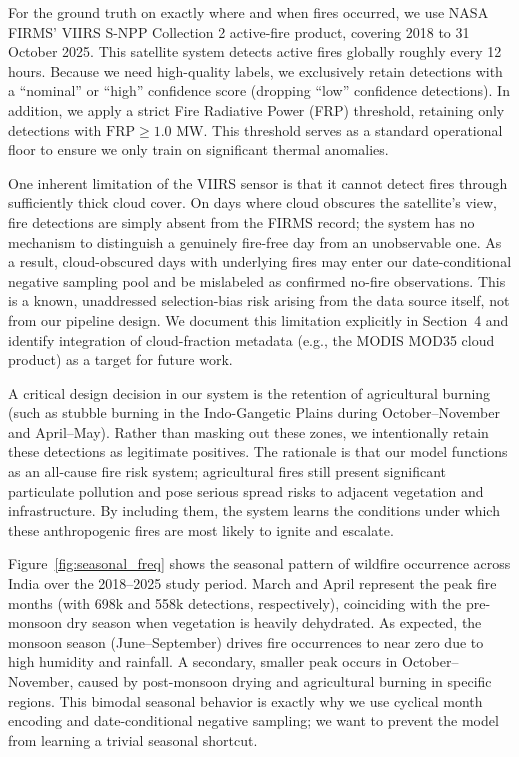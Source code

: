 \documentclass[11pt]{article}
\begin{document}
For the ground truth on exactly where and when fires occurred, we use NASA FIRMS' VIIRS S-NPP Collection 2 active-fire product, covering 2018 to 31 October 2025. This satellite system detects active fires globally roughly every 12 hours. Because we need high-quality labels, we exclusively retain detections with a ``nominal'' or ``high'' confidence score (dropping ``low'' confidence detections). In addition, we apply a strict Fire Radiative Power (FRP) threshold, retaining only detections with $\text{FRP} \ge 1.0$ MW. This threshold serves as a standard operational floor to ensure we only train on significant thermal anomalies.

One inherent limitation of the VIIRS sensor is that it cannot detect fires through sufficiently thick cloud cover. On days where cloud obscures the satellite's view, fire detections are simply absent from the FIRMS record; the system has no mechanism to distinguish a genuinely fire-free day from an unobservable one. As a result, cloud-obscured days with underlying fires may enter our date-conditional negative sampling pool and be mislabeled as confirmed no-fire observations. This is a known, unaddressed selection-bias risk arising from the data source itself, not from our pipeline design. We document this limitation explicitly in Section~4 and identify integration of cloud-fraction metadata (e.g., the MODIS MOD35 cloud product) as a target for future work.

A critical design decision in our system is the retention of agricultural burning (such as stubble burning in the Indo-Gangetic Plains during October--November and April--May). Rather than masking out these zones, we intentionally retain these detections as legitimate positives. The rationale is that our model functions as an all-cause fire risk system; agricultural fires still present significant particulate pollution and pose serious spread risks to adjacent vegetation and infrastructure. By including them, the system learns the conditions under which these anthropogenic fires are most likely to ignite and escalate.

Figure~\ref{fig:seasonal_freq} shows the seasonal pattern of wildfire occurrence across India over the 2018--2025 study period. March and April represent the peak fire months (with 698k and 558k detections, respectively), coinciding with the pre-monsoon dry season when vegetation is heavily dehydrated. As expected, the monsoon season (June--September) drives fire occurrences to near zero due to high humidity and rainfall. A secondary, smaller peak occurs in October--November, caused by post-monsoon drying and agricultural burning in specific regions. This bimodal seasonal behavior is exactly why we use cyclical month encoding and date-conditional negative sampling; we want to prevent the model from learning a trivial seasonal shortcut.
\end{document}
